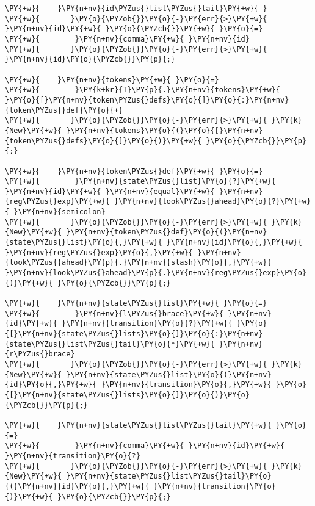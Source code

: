 \begin{Verbatim}[commandchars=\\\{\}]
\PY{+w}{    }\PY{n+nv}{id\PYZus{}list\PYZus{}tail}\PY{+w}{ }
\PY{+w}{	   }\PY{o}{\PYZob{}}\PY{o}{-}\PY{err}{>}\PY{+w}{ }\PY{n+nv}{id}\PY{+w}{ }\PY{o}{\PYZcb{}}\PY{+w}{ }\PY{o}{=}
\PY{+w}{        }\PY{n+nv}{comma}\PY{+w}{ }\PY{n+nv}{id}
\PY{+w}{	   }\PY{o}{\PYZob{}}\PY{o}{-}\PY{err}{>}\PY{+w}{ }\PY{n+nv}{id}\PY{o}{\PYZcb{}}\PY{p}{;}

\PY{+w}{    }\PY{n+nv}{tokens}\PY{+w}{ }\PY{o}{=}
\PY{+w}{        }\PY{k+kr}{T}\PY{p}{.}\PY{n+nv}{tokens}\PY{+w}{ }\PY{o}{[}\PY{n+nv}{token\PYZus{}defs}\PY{o}{]}\PY{o}{:}\PY{n+nv}{token\PYZus{}def}\PY{o}{+}
\PY{+w}{	   }\PY{o}{\PYZob{}}\PY{o}{-}\PY{err}{>}\PY{+w}{ }\PY{k}{New}\PY{+w}{ }\PY{n+nv}{tokens}\PY{o}{(}\PY{o}{[}\PY{n+nv}{token\PYZus{}defs}\PY{o}{]}\PY{o}{)}\PY{+w}{ }\PY{o}{\PYZcb{}}\PY{p}{;}

\PY{+w}{    }\PY{n+nv}{token\PYZus{}def}\PY{+w}{ }\PY{o}{=}
\PY{+w}{        }\PY{n+nv}{state\PYZus{}list}\PY{o}{?}\PY{+w}{ }\PY{n+nv}{id}\PY{+w}{ }\PY{n+nv}{equal}\PY{+w}{ }\PY{n+nv}{reg\PYZus{}exp}\PY{+w}{ }\PY{n+nv}{look\PYZus{}ahead}\PY{o}{?}\PY{+w}{ }\PY{n+nv}{semicolon}
\PY{+w}{	   }\PY{o}{\PYZob{}}\PY{o}{-}\PY{err}{>}\PY{+w}{ }\PY{k}{New}\PY{+w}{ }\PY{n+nv}{token\PYZus{}def}\PY{o}{(}\PY{n+nv}{state\PYZus{}list}\PY{o}{,}\PY{+w}{ }\PY{n+nv}{id}\PY{o}{,}\PY{+w}{ }\PY{n+nv}{reg\PYZus{}exp}\PY{o}{,}\PY{+w}{ }\PY{n+nv}{look\PYZus{}ahead}\PY{p}{.}\PY{n+nv}{slash}\PY{o}{,}\PY{+w}{ }\PY{n+nv}{look\PYZus{}ahead}\PY{p}{.}\PY{n+nv}{reg\PYZus{}exp}\PY{o}{)}\PY{+w}{ }\PY{o}{\PYZcb{}}\PY{p}{;}

\PY{+w}{    }\PY{n+nv}{state\PYZus{}list}\PY{+w}{ }\PY{o}{=}
\PY{+w}{        }\PY{n+nv}{l\PYZus{}brace}\PY{+w}{ }\PY{n+nv}{id}\PY{+w}{ }\PY{n+nv}{transition}\PY{o}{?}\PY{+w}{ }\PY{o}{[}\PY{n+nv}{state\PYZus{}lists}\PY{o}{]}\PY{o}{:}\PY{n+nv}{state\PYZus{}list\PYZus{}tail}\PY{o}{*}\PY{+w}{ }\PY{n+nv}{r\PYZus{}brace}
\PY{+w}{	   }\PY{o}{\PYZob{}}\PY{o}{-}\PY{err}{>}\PY{+w}{ }\PY{k}{New}\PY{+w}{ }\PY{n+nv}{state\PYZus{}list}\PY{o}{(}\PY{n+nv}{id}\PY{o}{,}\PY{+w}{ }\PY{n+nv}{transition}\PY{o}{,}\PY{+w}{ }\PY{o}{[}\PY{n+nv}{state\PYZus{}lists}\PY{o}{]}\PY{o}{)}\PY{o}{\PYZcb{}}\PY{p}{;}

\PY{+w}{    }\PY{n+nv}{state\PYZus{}list\PYZus{}tail}\PY{+w}{ }\PY{o}{=}
\PY{+w}{        }\PY{n+nv}{comma}\PY{+w}{ }\PY{n+nv}{id}\PY{+w}{ }\PY{n+nv}{transition}\PY{o}{?}
\PY{+w}{	   }\PY{o}{\PYZob{}}\PY{o}{-}\PY{err}{>}\PY{+w}{ }\PY{k}{New}\PY{+w}{ }\PY{n+nv}{state\PYZus{}list\PYZus{}tail}\PY{o}{(}\PY{n+nv}{id}\PY{o}{,}\PY{+w}{ }\PY{n+nv}{transition}\PY{o}{)}\PY{+w}{ }\PY{o}{\PYZcb{}}\PY{p}{;}


\end{Verbatim}
